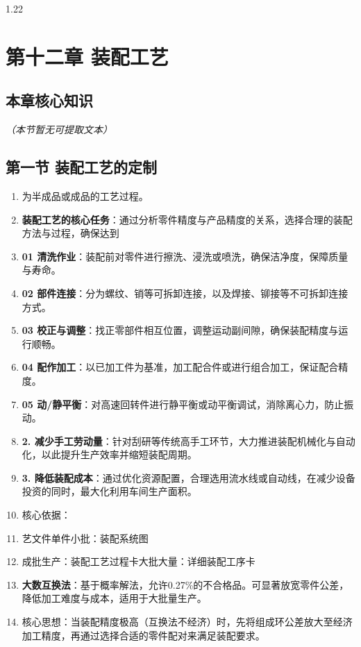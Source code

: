 \documentclass[12pt,a4paper]{article}
\begin{document}
\begin{spacing}{1.22}
\section{第十二章 装配工艺}
\subsection{本章核心知识}
\textit{（本节暂无可提取文本）}

\subsection{第一节 装配工艺的定制}
\begin{tcolorbox}[colback=yellow!6,colframe=red!55!black,title=重点,left=1mm,right=1mm]
\begin{enumerate}[leftmargin=2.2em,label=\arabic*.]
  \item 为半成品或成品的工艺过程。
  \item \textbf{装配工艺的核心任务}：通过分析零件精度与产品精度的关系，选择合理的装配方法与过程，确保达到
  \item \textbf{01 清洗作业}：装配前对零件进行擦洗、浸洗或喷洗，确保洁净度，保障质量与寿命。
  \item \textbf{02 部件连接}：分为螺纹、销等可拆卸连接，以及焊接、铆接等不可拆卸连接方式。
  \item \textbf{03 校正与调整}：找正零部件相互位置，调整运动副间隙，确保装配精度与运行顺畅。
  \item \textbf{04 配作加工}：以已加工件为基准，加工配合件或进行组合加工，保证配合精度。
  \item \textbf{05 动/静平衡}：对高速回转件进行静平衡或动平衡调试，消除离心力，防止振动。
  \item \textbf{2. 减少手工劳动量}：针对刮研等传统高手工环节，大力推进装配机械化与自动化，以此提升生产效率并缩短装配周期。
  \item \textbf{3. 降低装配成本}：通过优化资源配置，合理选用流水线或自动线，在减少设备投资的同时，最大化利用车间生产面积。
  \item 核心依据：
  \item 艺文件单件小批：装配系统图
  \item 成批生产：装配工艺过程卡大批大量：详细装配工序卡
  \item \textbf{大数互换法}：基于概率解法，允许0.27\%的不合格品。可显著放宽零件公差，降低加工难度与成本，适用于大批量生产。
  \item 核心思想：当装配精度极高（互换法不经济）时，先将组成环公差放大至经济加工精度，再通过选择合适的零件配对来满足装配要求。

\end{enumerate}
\end{tcolorbox}
\end{spacing}
\end{document}
